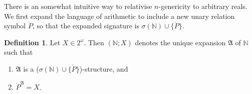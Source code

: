 \documentclass[12pt, twoside]{memoir}
\numberwithin{equation}{section}
\theoremstyle{definition}
\newtheorem{defi}[thm]{Definition}
\theoremstyle{remark}
\theoremstyle{definition}
\theoremstyle{definition}
\theoremstyle{definition}
\theoremstyle{remark}
\begin{document}
There is an somewhat intuitive way to relativise $n$-genericity to arbitrary reals. We first expand the language of arithmetic to include a new unary relation symbol $\dot{P}$, so that the expanded signature is $\sigma(\mathbb{N}) \cup \{\dot{P}\}$.

\begin{defi}
Let $X \in 2^{\omega}$. Then $(\mathbb{N}; X)$ denotes the unique expansion $\mathfrak{A}$ of $\mathbb{N}$ such that
\begin{enumerate}[label=(\alph*)]
    \item $\mathfrak{A}$ is a ($\sigma(\mathbb{N}) \cup \{\dot{P}\}$)-structure, and
    \item $\dot{P}^{\mathfrak{A}}= X$.
\end{enumerate}
\end{defi}
\end{document}

